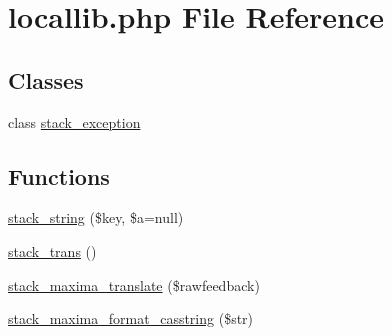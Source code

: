 \hypertarget{locallib_8php}{
\section{locallib.php File Reference}
\label{locallib_8php}
}
\subsection*{Classes}
\begin{DoxyCompactItemize}
\item 
class \hyperlink{classstack__exception}{stack\_\-exception}
\end{DoxyCompactItemize}
\subsection*{Functions}
\begin{DoxyCompactItemize}
\item 
\hyperlink{locallib_8php_a924130d2bdfcf1e962f0d7646582189d}{stack\_\-string} (\$key, \$a=null)
\item 
\hyperlink{locallib_8php_a7a72dd09633d87d845f3c0be6b65fc8e}{stack\_\-trans} ()
\item 
\hyperlink{locallib_8php_a3c8ef43c050b07992a9ae5fc13b43336}{stack\_\-maxima\_\-translate} (\$rawfeedback)
\item 
\hyperlink{locallib_8php_aefa2a15227e5139502714aaea0d7b559}{stack\_\-maxima\_\-format\_\-casstring} (\$str)
\end{DoxyCompactItemize}


